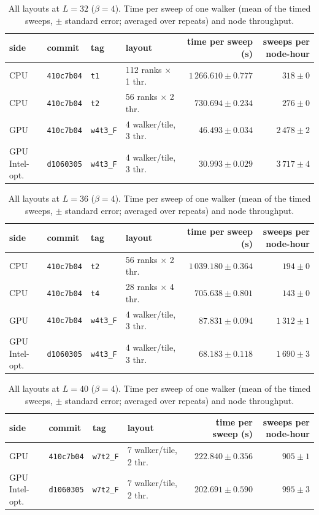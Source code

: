 \begin{table}[h]\centering\small
\caption{All layouts at $L=32$ ($\beta=4$). Time per sweep of one walker (mean of the timed sweeps, $\pm$ standard error; averaged over repeats) and node throughput.}
\begin{tabular}{@{}llllrr@{}}\toprule
side & commit & tag & layout & time per sweep (s) & sweeps per node-hour\\\midrule
CPU & \texttt{410c7b04} & \texttt{t1} & 112 ranks $\times$ 1 thr. & $1\,266.610 \pm 0.777$ & $318 \pm 0$\\
CPU & \texttt{410c7b04} & \texttt{t2} & 56 ranks $\times$ 2 thr. & $730.694 \pm 0.234$ & $276 \pm 0$\\
GPU & \texttt{410c7b04} & \texttt{w4t3\_F} & 4 walker/tile, 3 thr. & $46.493 \pm 0.034$ & $2\,478 \pm 2$\\
GPU Intel-opt. & \texttt{d1060305} & \texttt{w4t3\_F} & 4 walker/tile, 3 thr. & $30.993 \pm 0.029$ & $3\,717 \pm 4$\\
\bottomrule\end{tabular}\end{table}
\begin{table}[h]\centering\small
\caption{All layouts at $L=36$ ($\beta=4$). Time per sweep of one walker (mean of the timed sweeps, $\pm$ standard error; averaged over repeats) and node throughput.}
\begin{tabular}{@{}llllrr@{}}\toprule
side & commit & tag & layout & time per sweep (s) & sweeps per node-hour\\\midrule
CPU & \texttt{410c7b04} & \texttt{t2} & 56 ranks $\times$ 2 thr. & $1\,039.180 \pm 0.364$ & $194 \pm 0$\\
CPU & \texttt{410c7b04} & \texttt{t4} & 28 ranks $\times$ 4 thr. & $705.638 \pm 0.801$ & $143 \pm 0$\\
GPU & \texttt{410c7b04} & \texttt{w4t3\_F} & 4 walker/tile, 3 thr. & $87.831 \pm 0.094$ & $1\,312 \pm 1$\\
GPU Intel-opt. & \texttt{d1060305} & \texttt{w4t3\_F} & 4 walker/tile, 3 thr. & $68.183 \pm 0.118$ & $1\,690 \pm 3$\\
\bottomrule\end{tabular}\end{table}
\begin{table}[h]\centering\small
\caption{All layouts at $L=40$ ($\beta=4$). Time per sweep of one walker (mean of the timed sweeps, $\pm$ standard error; averaged over repeats) and node throughput.}
\begin{tabular}{@{}llllrr@{}}\toprule
side & commit & tag & layout & time per sweep (s) & sweeps per node-hour\\\midrule
GPU & \texttt{410c7b04} & \texttt{w7t2\_F} & 7 walker/tile, 2 thr. & $222.840 \pm 0.356$ & $905 \pm 1$\\
GPU Intel-opt. & \texttt{d1060305} & \texttt{w7t2\_F} & 7 walker/tile, 2 thr. & $202.691 \pm 0.590$ & $995 \pm 3$\\
\bottomrule\end{tabular}\end{table}
